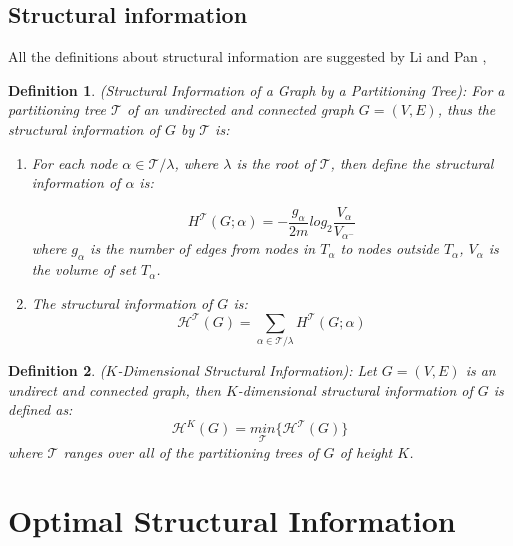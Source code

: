 \documentclass[10pt, conference, letterpaper]{IEEEtran}
\newtheorem{definition}{Definition}
\begin{document}
\subsection{Structural information}\label{subsec:structural_information}
All the definitions about structural information are suggested by Li and Pan \cite{li2016},
\begin{definition}
	\label{def:structural_information}
	(Structural Information of a Graph by a Partitioning Tree): For a partitioning tree $\mathcal{T}$ of an undirected and connected graph $G=(V,E)$, thus the structural information of $G$ by $\mathcal{T}$ is:
	
	\begin{enumerate}
		\item For each node $\alpha \in \mathcal{T}/\lambda$, where $\lambda$ is the root of $\mathcal{T}$, then define the structural information of $\alpha$ is:
		
		\begin{equation}
		\label{eq:information_alpha}
		H^{\mathcal{T}}(G;\alpha)=-\frac{g_{\alpha}}{2m}log_2\frac{V_{\alpha}}{V_{\alpha^-}}
		\end{equation}
		where $g_{\alpha}$ is the number of edges from nodes in $T_{\alpha}$ to nodes outside $T_{\alpha}$, $V_{\alpha}$ is the volume of set $T_{\alpha}$. 
		
		\item The structural information of $G$ is:
		\begin{equation}
		\label{eq:information_alpha}
			\mathcal{H}^{\mathcal{T}}(G)=\sum_{\alpha \in \mathcal{T}/\lambda}H^{\mathcal{T}}(G;\alpha)
		\end{equation}		
	\end{enumerate}
\end{definition}

\begin{definition}\label{def:kdimensional_information}
($K$-Dimensional Structural Information): Let $G=(V,E)$ is an undirect and connected graph, then $K$-dimensional structural information of $G$ is defined as:
\begin{equation}
\label{eq:kdimensional_information}
\mathcal{H}^{K}(G)=\underset{\mathcal{T}}{min}\{\mathcal{H}^{\mathcal{T}}(G)\} 
\end{equation}	
where $\mathcal{T}$ ranges over all of the partitioning trees of $G$ of height $K$.	
\end{definition}


\section{Optimal Structural Information}
\label{sec:optimal_strctrual_information}
\end{document}
